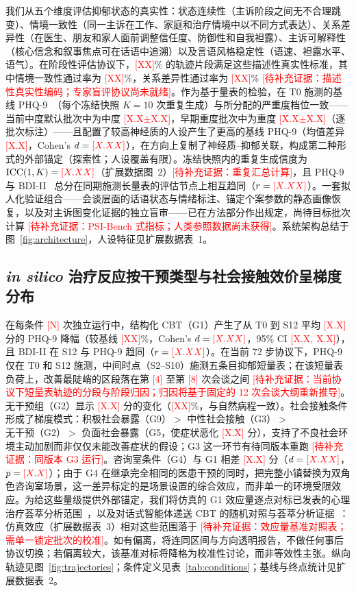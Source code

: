 \documentclass[11pt,a4paper]{article}
\newcommand{\ph}[1]{\textcolor{red}{[#1]}}
\begin{document}
我们从五个维度评估抑郁状态的真实性：状态连续性（主诉阶段之间无不合理跳变）、情境一致性（同一主诉在工作、家庭和治疗情境中以不同方式表达）、关系差异性（在医生、朋友和家人面前调整信任度、防御性和自我袒露）、主诉可解释性（核心信念和叙事焦点可在话语中追溯）以及言语风格稳定性（语速、袒露水平、语气）。在阶段性评估协议下，\ph{XX}\% 的轨迹片段满足这些描述性真实性标准，其中情境一致性通过率为 \ph{XX}\%，关系差异性通过率为 \ph{XX}\% \ph{待补充证据：描述性真实性编码；专家盲评协议尚未就绪}。作为基于量表的检验，在 T0 施测的基线 PHQ-9~\cite{kroenke2001}（每个冻结快照 $K=10$ 次重复生成）与所分配的严重度档位一致——当前中度默认批次中为中度 \ph{X.X$\pm$X.X}，早期重度批次中为重度 \ph{X.X$\pm$X.X}（逐批次标注）——且配置了较高神经质的人设产生了更高的基线 PHQ-9（均值差异 \ph{X.X}，Cohen's $d = \ph{X.XX}$），在方向上复制了神经质--抑郁关联，构成第二种形式的外部锚定（探索性；人设覆盖有限）。冻结快照内的重复生成信度为 $\mathrm{ICC}(1,K) = \ph{X.XX}$（扩展数据图~2）\ph{待补充证据：重复汇总计算}，且 PHQ-9 与 BDI-II~\cite{beck1996} 总分在同期施测长量表的评估节点上相互趋同（$r = \ph{X.XX}$）。一套拟人化验证组合——会谈层面的话语状态与情绪标注、锚定个案参数的静态画像恢复，以及对主诉图变化证据的独立盲审——已在方法部分作出规定，尚待目标批次计算 \ph{待补充证据：PSI-Bench 式指标；人类参照数据尚未获得}。系统架构总结于图~\ref{fig:architecture}，人设特征见扩展数据表~1。

\subsection*{\emph{in silico} 治疗反应按干预类型与社会接触效价呈梯度分布}

在每条件 \ph{N} 次独立运行中，结构化 CBT（G1）产生了从 T0 到 S12 平均 \ph{X.X} 分的 PHQ-9 降幅（较基线 \ph{XX}\%，Cohen's $d = \ph{X.XX}$，95\% CI \ph{X.X, X.X}），且 BDI-II 在 S12 与 PHQ-9 趋同（$r = \ph{X.XX}$）。在当前 72 步协议下，PHQ-9 仅在 T0 和 S12 施测，中间时点（S2--S10）施测五条目抑郁短量表；在该短量表负荷上，改善最陡峭的区段落在第 \ph{4} 至第 \ph{8} 次会谈之间 \ph{待补充证据：当前协议下短量表轨迹的分段与阶段归因；归因将基于固定的 12 次会谈大纲重新推导}。无干预组（G2）显示 \ph{X.X} 分的变化（\ph{XX}\%，与自然病程一致）。社会接触条件形成了梯度模式：积极社会暴露（G9）$>$ 中性社会接触（G3）$>$ 无干预（G2）$>$ 负面社会暴露（G5，使症状恶化 \ph{X.X} 分），支持了不良社会环境主动加剧而非仅仅未能改善症状的假设；G3 这一环节有待同版本重跑 \ph{待补充证据：同版本 G3 运行}。咨询室条件（G4）与 G1 相差 \ph{X.X} 分（$d = \ph{X.XX}$，$p = \ph{X.X}$）；由于 G4 在继承完全相同的医患干预的同时，把完整小镇替换为双角色咨询室场景，这一差异标定的是场景设置的综合效应，而非单一的环境受限效应。为给这些量级提供外部锚定，我们将仿真的 G1 效应量逐点对标已发表的心理治疗荟萃分析范围~\cite{cuijpers2013,hofmann2012,cuijpers2020}，以及对话式智能体递送 CBT 的随机对照与荟萃分析证据~\cite{heinz2025,hang2026}：仿真效应（扩展数据表~3）相对这些范围落于 \ph{待补充证据：效应量基准对照表；需单一锁定批次的校准}。如有偏离，将连同区间与方向透明报告，不做任何事后协议切换；若偏离较大，该基准对标将降格为校准性讨论，而非等效性主张。纵向轨迹见图~\ref{fig:trajectories}；条件定义见表~\ref{tab:conditions}；基线与终点统计见扩展数据表~2。
\end{document}
